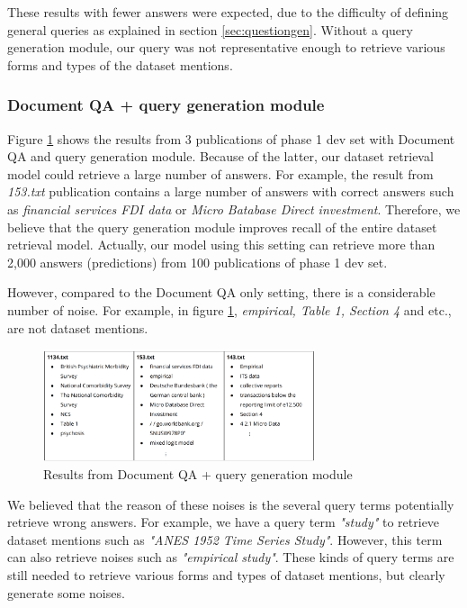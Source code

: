\documentclass[11pt]{article}
\begin{document}
These results with fewer answers were expected, due to the difficulty of defining general queries as explained in section \ref{sec:questiongen}. Without a query generation module, our query was not representative enough to retrieve various forms and types of the dataset mentions.

\subsubsection{Document QA + query generation module}
Figure \ref{fig:docqaquery} shows the results from 3 publications of phase 1 dev set with Document QA and query generation module. Because of the latter, our dataset retrieval model could retrieve a large number of answers. For example, the result from \textit{153.txt} publication contains a large number of answers with correct answers such as \textit{financial services FDI data} or \textit{Micro Batabase Direct investment}. Therefore, we believe that the query generation module improves recall of the entire dataset retrieval model. Actually, our model using this setting can retrieve more than 2,000 answers (predictions) from 100 publications of phase 1 dev set.

However, compared to the Document QA only setting, there is a considerable number of noise. For example, in figure \ref{fig:docqaquery}, \textit{empirical, Table 1, Section 4} and etc., are not dataset mentions. 

\begin{figure}[!htb]
    \centering
    \includegraphics[width = 8cm]{phase1+querygen.png}
    \caption{Results from Document QA + query generation module}
    \label{fig:docqaquery}
\end{figure}

We believed that the reason of these noises is the several query terms potentially retrieve wrong answers. For example, we have a query term \textit{"study"} to retrieve dataset mentions such as \textit{"ANES 1952 Time Series Study"}. However, this term can also retrieve noises such as \textit{"empirical study"}. These kinds of query terms are still needed to retrieve various forms and types of dataset mentions, but clearly generate some noises.
\end{document}
